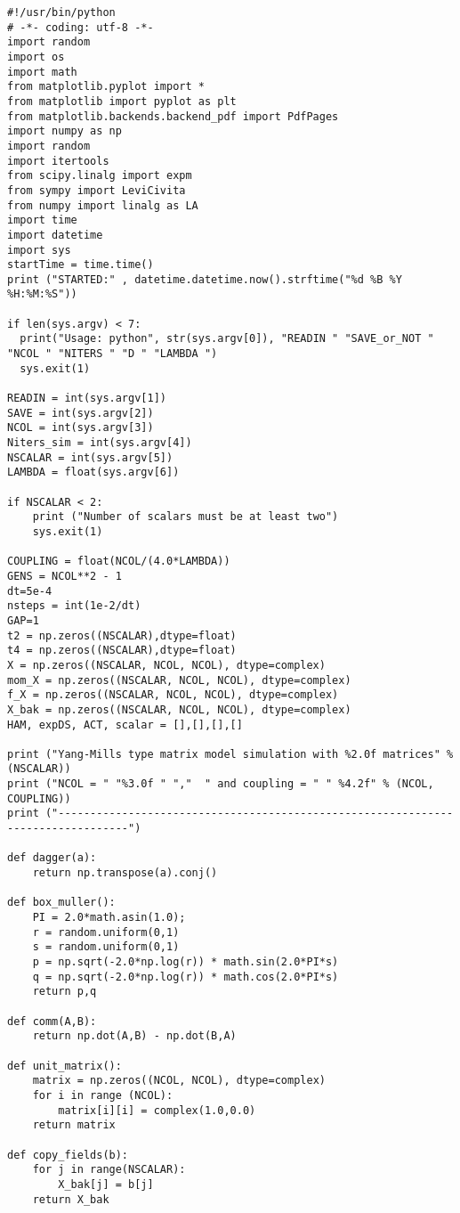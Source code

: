 \begin{lstlisting}
#!/usr/bin/python
# -*- coding: utf-8 -*-
import random
import os
import math
from matplotlib.pyplot import *
from matplotlib import pyplot as plt
from matplotlib.backends.backend_pdf import PdfPages
import numpy as np
import random
import itertools 
from scipy.linalg import expm
from sympy import LeviCivita
from numpy import linalg as LA
import time 
import datetime 
import sys
startTime = time.time()
print ("STARTED:" , datetime.datetime.now().strftime("%d %B %Y %H:%M:%S"))

if len(sys.argv) < 7:
  print("Usage: python", str(sys.argv[0]), "READIN " "SAVE_or_NOT " "NCOL " "NITERS " "D " "LAMBDA ")
  sys.exit(1)

READIN = int(sys.argv[1])
SAVE = int(sys.argv[2])
NCOL = int(sys.argv[3]) 
Niters_sim = int(sys.argv[4]) 
NSCALAR = int(sys.argv[5])
LAMBDA = float(sys.argv[6])

if NSCALAR < 2:
    print ("Number of scalars must be at least two")
    sys.exit(1) 

COUPLING = float(NCOL/(4.0*LAMBDA))
GENS = NCOL**2 - 1
dt=5e-4
nsteps = int(1e-2/dt)
GAP=1
t2 = np.zeros((NSCALAR),dtype=float)
t4 = np.zeros((NSCALAR),dtype=float)
X = np.zeros((NSCALAR, NCOL, NCOL), dtype=complex)
mom_X = np.zeros((NSCALAR, NCOL, NCOL), dtype=complex)
f_X = np.zeros((NSCALAR, NCOL, NCOL), dtype=complex)
X_bak = np.zeros((NSCALAR, NCOL, NCOL), dtype=complex)
HAM, expDS, ACT, scalar = [],[],[],[]

print ("Yang-Mills type matrix model simulation with %2.0f matrices" % (NSCALAR)) 
print ("NCOL = " "%3.0f " ","  " and coupling = " " %4.2f" % (NCOL, COUPLING)) 
print ("---------------------------------------------------------------------------------")

def dagger(a):
    return np.transpose(a).conj()

def box_muller():
    PI = 2.0*math.asin(1.0);    
    r = random.uniform(0,1)
    s = random.uniform(0,1)
    p = np.sqrt(-2.0*np.log(r)) * math.sin(2.0*PI*s)
    q = np.sqrt(-2.0*np.log(r)) * math.cos(2.0*PI*s)
    return p,q

def comm(A,B):
    return np.dot(A,B) - np.dot(B,A)

def unit_matrix():
    matrix = np.zeros((NCOL, NCOL), dtype=complex)
    for i in range (NCOL):
        matrix[i][i] = complex(1.0,0.0)
    return matrix

def copy_fields(b):
    for j in range(NSCALAR):
        X_bak[j] = b[j]
    return X_bak


\end{lstlisting}
